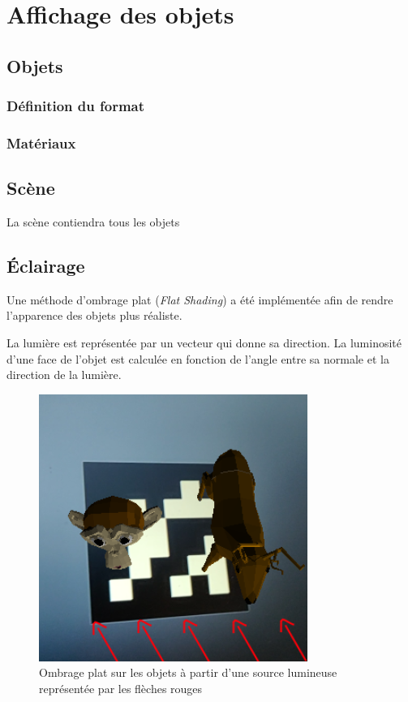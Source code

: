 \newpage
{}

    \section{Affichage des objets}

        \subsection{Objets}

            \subsubsection{Définition du format}

                

            \subsubsection{Matériaux}

        \subsection{Scène}

        La scène contiendra tous les objets 


        \subsection{Éclairage}

        Une méthode d'ombrage plat (\textit{Flat Shading}) a été implémentée afin de rendre l'apparence des objets plus réaliste.

        La lumière est représentée par un vecteur qui donne sa direction. La luminosité d'une face de l'objet est calculée en fonction de l'angle entre sa normale et la direction de la lumière.

        \begin{figure}[!h]
            \centering
            \includegraphics[scale=0.5]{img/flat_shading.png}
            \caption{Ombrage plat sur les objets à partir d'une source lumineuse représentée par les flèches rouges}
        \end{figure}

